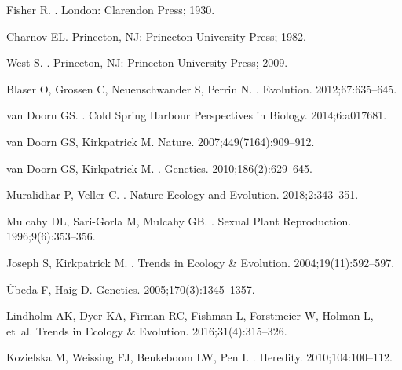 \documentclass[10pt,letterpaper]{article}
\begin{document}
\begin{thebibliography}{100}
Fisher R.
.
\newblock London: Clarendon Press; 1930.

Charnov EL.
\newblock Princeton, NJ: Princeton University Press; 1982.

West S.
.
\newblock Princeton, NJ: Princeton University Press; 2009.

Blaser O, Grossen C, Neuenschwander S, Perrin N.
.
\newblock Evolution. 2012;67:635--645.

van Doorn GS.
.
\newblock Cold Spring Harbour Perspectives in Biology. 2014;6:a017681.

van Doorn GS, Kirkpatrick M.
\newblock Nature. 2007;449(7164):909--912.

van Doorn GS, Kirkpatrick M.
.
\newblock Genetics. 2010;186(2):629--645.

Muralidhar P, Veller C.
.
\newblock Nature Ecology and Evolution. 2018;2:343–351.

Mulcahy DL, Sari-Gorla M, Mulcahy GB.
.
\newblock Sexual Plant Reproduction. 1996;9(6):353--356.

Joseph S, Kirkpatrick M.
.
\newblock Trends in Ecology {\&} Evolution. 2004;19(11):592--597.

{\'U}beda F, Haig D.
\newblock Genetics. 2005;170(3):1345--1357.

Lindholm AK, Dyer KA, Firman RC, Fishman L, Forstmeier W, Holman L, et~al.
\newblock Trends in Ecology {\&} Evolution. 2016;31(4):315--326.

Kozielska M, Weissing FJ, Beukeboom LW, Pen I.
.
\newblock Heredity. 2010;104:100--112.


\end{thebibliography}
\end{document}
